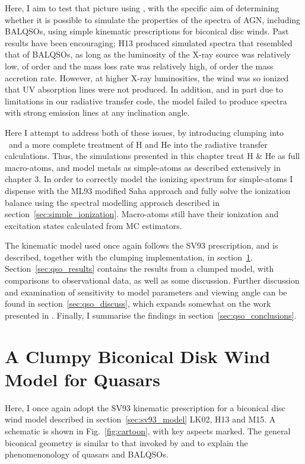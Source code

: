 Here, I aim to test that picture using \py, with
the specific aim of determining whether it is possible to 
simulate the properties of the spectra of AGN, including BALQSOs, 
using simple kinematic prescriptions for biconical disc winds. 
Past results have been encouraging; H13
produced simulated spectra that resembled that of BALQSOs, as long as 
the luminosity of the X-ray source was relatively low, of order 
 and the mass loss rate was relatively high, of order the 
mass accretion rate.  However, at higher X-ray luminosities, the wind was
so ionized that UV absorption lines were not produced.  In addition, and 
in part due to limitations in our radiative transfer code, the model failed 
to produce spectra with strong emission lines at any inclination angle.

Here I attempt to address both of these issues, by
introducing clumping into \py\ and a more complete
treatment of H and He into the radiative transfer calculations.
Thus, the simulations presented in this chapter treat H \& He as full
macro-atoms, and model metals as simple-atoms as described extensively
in chapter 3. In order to correctly model the ionizing spectrum for simple-atoms 
I dispense with the ML93 modified Saha approach and fully solve the ionization
balance using the spectral modelling approach described 
in section~\ref{sec:simple_ionization}. Macro-atoms still have their
ionization and excitation states calculated from MC estimators.

The kinematic model used once again follows the SV93
prescription, and is described, together with the clumping 
implementation, in section~\ref{sec:clumpy_wind_model}.
Section~\ref{sec:qso_results} contains the results from a clumped model, 
with comparisons to observational data, as well as some discussion. 
Further discussion and examination of sensitivity to model parameters
and viewing angle can be found in section~\ref{sec:qso_discuss}, which
expands somewhat on the work presented in \citep{M16}.
Finally, I summarise the findings in section~\ref{sec:qso_conclusions}.

%
%

\section{A Clumpy Biconical Disk Wind Model for Quasars}
\label{sec:clumpy_wind_model}
Here, I once again adopt the SV93 kinematic prescription for a 
biconical disc wind model described in section~\ref{sec:sv93_model}
LK02, H13 and M15. A schematic is shown in Fig.~\ref{fig:cartoon},
with key aspects marked. The general biconical
geometry is similar to that invoked by \cite{MCGV95} and 
\cite{elvis2000} to explain the phenomenonology
of quasars and BALQSOs.

